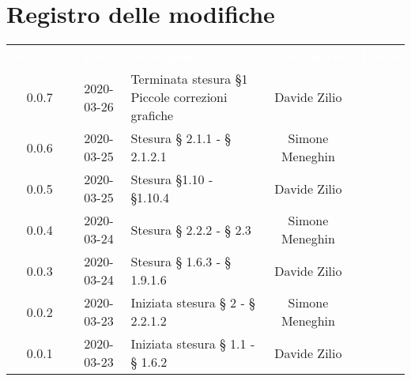 
\section*{Registro delle modifiche}
{
	\centering
	\begin{longtable}{ c c  C{4cm}  c  c }
		\textcolor{white}{\textbf{Versione}} & \textcolor{white}{\textbf{Data}} & \textcolor{white}{\textbf{Descrizione}} & \textcolor{white}{\textbf{Nominativo}} & \textcolor{white}{\textbf{Ruolo}}\\
		0.0.7 & 2020-03-26 & Terminata stesura \S 1 \newline Piccole correzioni grafiche & Davide Zilio &\reda{}\\
		0.0.6 & 2020-03-25 & Stesura § 2.1.1 - § 2.1.2.1 & Simone Meneghin &\reda{}\\	
		0.0.5 & 2020-03-25 & Stesura \S 1.10 - \S 1.10.4 & Davide Zilio & \reda{}\\

		0.0.4 & 2020-03-24 & Stesura § 2.2.2 - § 2.3 & Simone Meneghin &\reda{}\\		
		
		0.0.3 & 2020-03-24 & Stesura § 1.6.3 - § 1.9.1.6 & Davide Zilio &\reda{}\\
		
		0.0.2 & 2020-03-23 & Iniziata stesura § 2 - § 2.2.1.2 & Simone Meneghin &\reda{}\\
		
		0.0.1 & 2020-03-23 & Iniziata stesura § 1.1 - § 1.6.2 & Davide Zilio &\reda{}\\		
		
	\end{longtable}

}